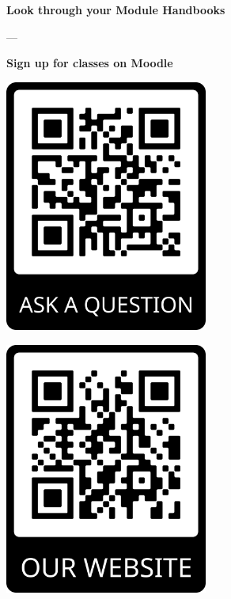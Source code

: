 \documentclass[aspectratio=169,hyperref={unicode},xcolor={dvipsnames}]{beamer}
\begin{document}
\begin{frame}
\begin{center}
\textbf{Look through your Module Handbooks}

---

\textbf{Sign up for classes on Moodle}
\vspace{1em}

\begin{minipage}{0.4\textwidth}
\centering
    \includegraphics[width=0.5\textwidth]{../QRqa.png}
  \end{minipage}
  \hfill
  \begin{minipage}{0.4\textwidth}
  \centering
    \includegraphics[width=0.5\textwidth]{../QRweb.png}
  \end{minipage}
\end{center}
\end{frame}
\end{document}
